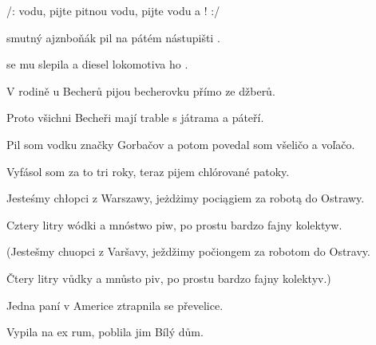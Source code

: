 
\zr
/:  vodu, pijte pitnou vodu, pijte vodu a  ! :/
\kr

\zs
{} smutný ajznboňák pil na pátém nástupišti 
.

 se mu slepila a diesel lokomotiva ho .
\ks

\zr  \kr

\zs
V rodině u Becherů pijou becherovku přímo ze džberů.

Proto všichni Becheři mají trable s játrama a páteří.
\ks

\zr  \kr

\zs
Pil som vodku značky Gorbačov a potom povedal som všeličo a voľačo.

Vyfásol som za to tri roky, teraz pijem chlórované patoky.
\ks

\zr  \kr

\zs
Jesteśmy chłopci z Warszawy, jeżdżimy pociągiem za robotą do Ostrawy.

Cztery litry wódki a mnóstwo piw, po prostu bardzo fajny kolektyw.

(Jestešmy chuopci z Varšavy, ježdžimy počiongem za robotom do Ostravy.

Čtery litry vůdky a mnůsto piv, po prostu bardzo fajny kolektyv.)

\ks

\zr  \kr

\zs
Jedna paní v Americe ztrapnila se převelice.

Vypila na ex rum, poblila jim Bílý dům.
\ks

\zr  \kr

\kp





